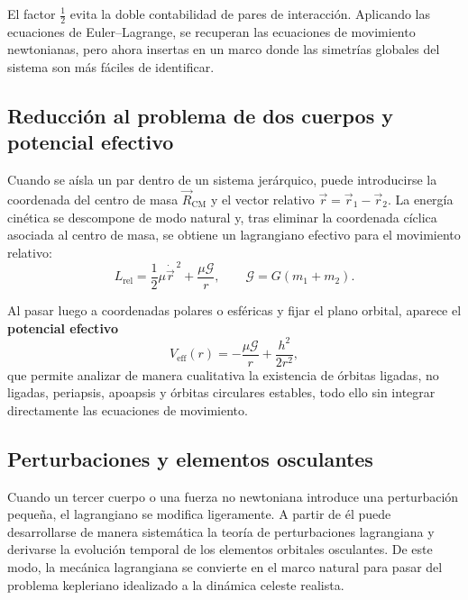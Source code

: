 El factor \(\tfrac{1}{2}\) evita la doble contabilidad de pares de interacción. Aplicando las ecuaciones de Euler--Lagrange, se recuperan las ecuaciones de movimiento newtonianas, pero ahora insertas en un marco donde las simetrías globales del sistema son más fáciles de identificar.

\subsection{Reducción al problema de dos cuerpos y potencial efectivo}
Cuando se aísla un par dentro de un sistema jerárquico, puede introducirse la coordenada del centro de masa \(\vec{R}_{\text{CM}}\) y el vector relativo \(\vec{r}=\vec{r}_1-\vec{r}_2\). La energía cinética se descompone de modo natural y, tras eliminar la coordenada cíclica asociada al centro de masa, se obtiene un lagrangiano efectivo para el movimiento relativo:
\[
L_{\text{rel}} = \frac{1}{2}\mu\dot{\vec{r}}^{\,2} + \frac{\mu\mathcal{G}}{r},
\qquad
\mathcal{G}=G(m_1+m_2).
\]

Al pasar luego a coordenadas polares o esféricas y fijar el plano orbital, aparece el \textbf{potencial efectivo}
\[
V_{\text{eff}}(r) = -\frac{\mu\mathcal{G}}{r} + \frac{h^2}{2r^2},
\]
que permite analizar de manera cualitativa la existencia de órbitas ligadas, no ligadas, periapsis, apoapsis y órbitas circulares estables, todo ello sin integrar directamente las ecuaciones de movimiento.

\subsection{Perturbaciones y elementos osculantes}
Cuando un tercer cuerpo o una fuerza no newtoniana introduce una perturbación pequeña, el lagrangiano se modifica ligeramente. A partir de él puede desarrollarse de manera sistemática la teoría de perturbaciones lagrangiana y derivarse la evolución temporal de los elementos orbitales osculantes. De este modo, la mecánica lagrangiana se convierte en el marco natural para pasar del problema kepleriano idealizado a la dinámica celeste realista.

